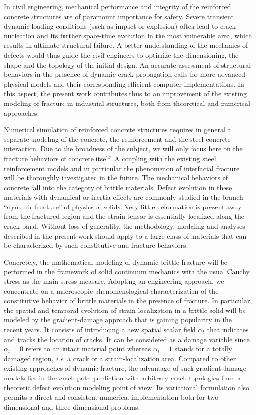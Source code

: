 In civil engineering, mechanical performance and integrity of the reinforced concrete structures are of paramount importance for safety. Severe transient dynamic loading conditions (such as impact or explosion) often lead to crack nucleation and its further space-time evolution in the most vulnerable area, which results in ultimate structural failure. A better understanding of the mechanics of defects would thus guide the civil engineers to optimize the dimensioning, the shape and the topology of the initial design. An accurate assessment of structural behaviors in the presence of dynamic crack propagation calls for more advanced physical models and their corresponding efficient computer implementations. In this aspect, the present work contributes thus to an improvement of the existing modeling of fracture in industrial structures, both from theoretical and numerical approaches.

Numerical simulation of reinforced concrete structures requires in general a separate modeling of the concrete, the reinforcement and the steel-concrete interaction. Due to the broadness of the subject, we will only focus here on the fracture behaviors of concrete itself. A coupling with the existing steel reinforcement models and in particular the phenomenon of interfacial fracture will be thoroughly investigated in the future. The mechanical behaviors of concrete fall into the category of brittle materials. Defect evolution in these materials with dynamical or inertia effects are commonly studied in the branch ``dynamic fracture'' of physics of solids. Very little deformation is present away from the fractured region and the strain tensor is essentially localized along the crack band. Without loss of generality, the methodology, modeling and analyses described in the present work should apply to a large class of materials that can be characterized by such constitutive and fracture behaviors.

Concretely, the mathematical modeling of dynamic brittle fracture will be performed in the framework of solid continuum mechanics with the usual Cauchy stress as the main stress measure. Adopting an engineering approach, we concentrate on a macroscopic phenomenological characterization of the constitutive behavior of brittle materials in the presence of fracture. In particular, the spatial and temporal evolution of strain localization in a brittle solid will be modeled by the gradient-damage approach that is gaining popularity in the recent years. It consists of introducing a new spatial scalar field $\alpha_t$ that indicates and tracks the location of cracks. It can be considered as a damage variable since $\alpha_t=0$ refers to an intact material point whereas $\alpha_t=1$ stands for a totally damaged region, \emph{i.e.} a crack or a strain-localization area. Compared to other existing approaches of dynamic fracture, the advantage of such gradient damage models lies in the crack path prediction with arbitrary crack topologies from a theoretic defect evolution modeling point of view. Its variational formulation also permits a direct and consistent numerical implementation both for two-dimensional and three-dimensional problems.

